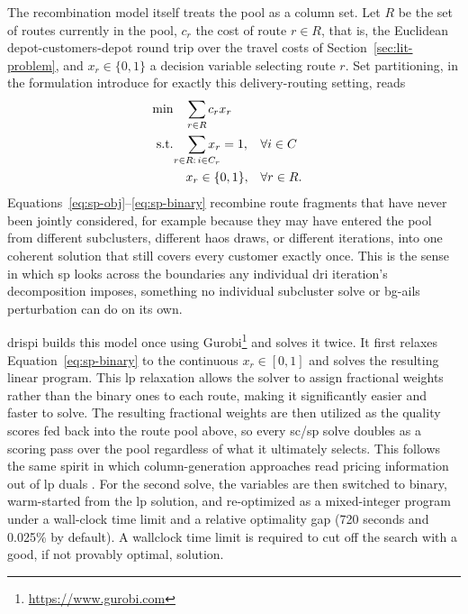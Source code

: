 The recombination model itself treats the pool as a column set. Let $R$ be the set of routes currently in the pool, $c_r$ the cost of route $r \in R$, that is, the Euclidean depot-customers-depot round trip over the travel costs of Section~\ref{sec:lit-problem}, and $x_r \in \{0, 1\}$ a decision variable selecting route $r$. Set partitioning, in the formulation \citet{balinskiIntegerProgramDelivery1964} introduce for exactly this delivery-routing setting, reads
\begin{align}
\text{min} \quad & \sum_{\mathclap{r \in R}} c_r x_r \label{eq:sp-obj}\\
\text{s.t.} \quad & \sum_{\mathclap{r \in R:\, i \in C_r}} x_r = 1, && \forall i \in C \label{eq:sp-partition}\\
& x_r \in \{0, 1\}, && \forall r \in R. \label{eq:sp-binary}
\end{align}
Equations~\ref{eq:sp-obj}--\ref{eq:sp-binary} recombine route fragments that have never been jointly considered, for example because they may have entered the pool from different subclusters, different \gls{haos} draws, or different iterations, into one coherent solution that still covers every customer exactly once. This is the sense in which \gls{sp} looks across the boundaries any individual \gls{dri} iteration's decomposition imposes, something no individual subcluster solve or \gls{bg-ails} perturbation can do on its own.

\gls{drispi} builds this model once using Gurobi\footnote{\url{https://www.gurobi.com}} and solves it twice. It first relaxes Equation~\ref{eq:sp-binary} to the continuous $x_r \in [0, 1]$ and solves the resulting linear program. This \gls{lp} relaxation allows the solver to assign fractional weights rather than the binary ones to each route, making it significantly easier and faster to solve. The resulting fractional weights are then utilized as the quality scores fed back into the route pool above, so every \gls{sc}/\gls{sp} solve doubles as a scoring pass over the pool regardless of what it ultimately selects. This follows the same spirit in which column-generation approaches read pricing information out of \gls{lp} duals \citep{lubbeckeSelectedTopicsColumn2005}. For the second solve, the variables are then switched to binary, warm-started from the \gls{lp} solution, and re-optimized as a mixed-integer program under a wall-clock time limit and a relative optimality gap (720 seconds and 0.025\% by default). A wallclock time limit is required to cut off the search with a good, if not provably optimal, solution.

